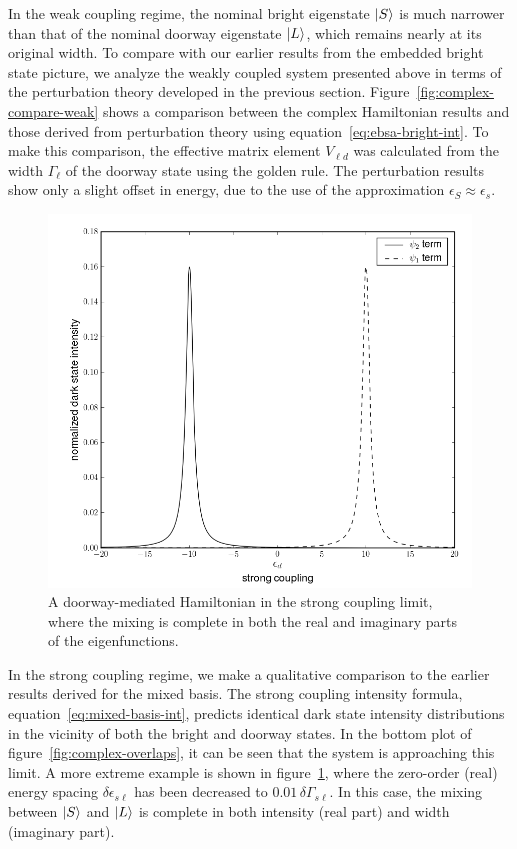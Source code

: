 In the weak coupling regime, the nominal bright eigenstate $\mathinner{|{S}\rangle}$
is much narrower than that of the nominal doorway eigenstate
$\mathinner{|{L}\rangle}$, which remains nearly at its original width.  To compare
with our earlier results from the embedded bright state picture, we
analyze the weakly coupled system presented above in terms of the
perturbation theory developed in the previous section.
Figure~\ref{fig:complex-compare-weak} shows a comparison between the
complex Hamiltonian results and those derived from perturbation theory
using equation~\ref{eq:ebsa-bright-int}. To make this comparison, the
effective matrix element $V_{\ell d}$ was calculated from the width
$\Gamma_\ell$ of the doorway state using the golden rule. The
perturbation results show only a slight offset in energy, due to the
use of the approximation $\epsilon_{S} \approx \epsilon_{s}$.

\begin{figure}
  \caption{A doorway-mediated Hamiltonian in the strong coupling
    limit, where the mixing is complete in both the real and imaginary
    parts of the eigenfunctions.}
  \label{fig:complex-compare-strong}
  \centering
  \includegraphics[width=6in]{complex-compare-strong.png}
\end{figure}

In the strong coupling regime, we make a qualitative comparison to the
earlier results derived for the mixed basis.  The strong coupling
intensity formula, equation~\ref{eq:mixed-basis-int}, predicts
identical dark state intensity distributions in the vicinity of both
the bright and doorway states.  In the bottom plot of
figure~\ref{fig:complex-overlaps}, it can be seen that the system is
approaching this limit.  A more extreme example is shown in
figure~\ref{fig:complex-compare-strong}, where the zero-order (real)
energy spacing $\delta \epsilon_{s\ell}$ has been decreased to $0.01 \,
\delta \Gamma_{s\ell}$. In this case, the mixing between $\mathinner{|{S}\rangle}$ and
$\mathinner{|{L}\rangle}$ is complete in both intensity (real part) and width
(imaginary part).

